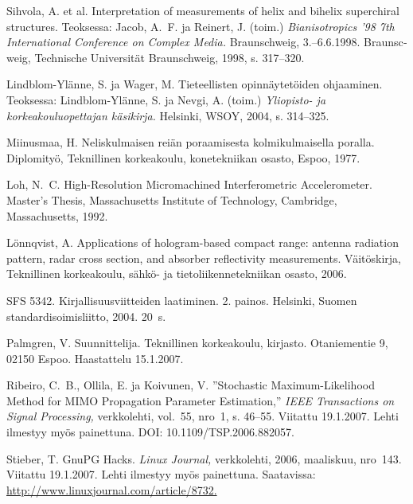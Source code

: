\documentclass[finnish, 12pt, a4paper, elec, utf8, a-2b, online]{aaltothesis}
\begin{document}
\begin{thebibliography}{99}
 Sihvola, A. et al.
	\foreignlanguage{english}{Interpretation of measurements of helix and bihelix 
		superchiral structures.}
Teoksessa: Jacob, A.\ F. ja	Reinert, J. (toim.)
\foreignlanguage{english}{\textit{Bianisotropics '98 7th International 
		Conference on Complex Media.}}
\foreignlanguage{german}{Braunschweig, 3.--6.6.1998. Braunscweig, Technische 
	Universität Braunschweig,} 1998, s. 317--320.

 Lindblom-Ylänne, S. ja Wager, M.
   Tieteellisten opinnäytetöiden ohjaaminen.
   Teoksessa: Lindblom-Ylänne, S. ja Nevgi, A. (toim.)
   \textit{Yliopisto- ja korkeakouluopettajan käsikirja.}
   Helsinki, WSOY, 2004, s. 314--325.

 Miinusmaa, H. Neliskulmaisen reiän poraamisesta
   kolmikulmaisella poralla. Diplomityö, Teknillinen korkeakoulu,
   konetekniikan osasto, Espoo, 1977.

 Loh, N.\ C. \foreignlanguage{english}{High-Resolution 
	Micromachined Interferometric Accelerometer. Master's Thesis, 
	Massachusetts Institute of Technology, Cambridge, Massachusetts,} 1992.

 Lönnqvist, A.
   \foreignlanguage{english}{Applications of hologram-based compact range:
	antenna radiation pattern, radar cross section, and absorber reflectivity 
	measurements.}
	Väitöskirja, Teknillinen korkeakoulu, sähkö- ja tietoliikennetekniikan
	osasto, 2006.
	
 SFS 5342. Kirjallisuusviitteiden laatiminen. 2. painos.
   Helsinki, Suomen standardisoimisliitto, 2004. 20~s.

 Palmgren, V. Suunnittelija. Teknillinen korkeakoulu,
   kirjasto. Otaniementie 9, 02150 Espoo. Haastattelu 15.1.2007.

 Ribeiro, C.\ B., Ollila, E. ja Koivunen, V.
   \foreignlanguage{english}{''Stochastic Maximum-Likelihood Method for MIMO
	Propagation Parameter Estimation,''}
	\textit{IEEE Transactions on Signal Processing,} verkkolehti, vol.~55,
	nro~1, s. 46--55. Viitattu 19.1.2007. Lehti ilmestyy myös painettuna. 
	DOI: 10.1109/TSP.2006.882057.

 Stieber, T. GnuPG Hacks. \textit{Linux Journal,}
   verkkolehti, 2006, maaliskuu, nro~143. Viitattu 19.1.2007. Lehti ilmestyy
   myös painettuna. Saatavissa: \url{http://www.linuxjournal.com/article/8732.}


\end{thebibliography}
\end{document}
